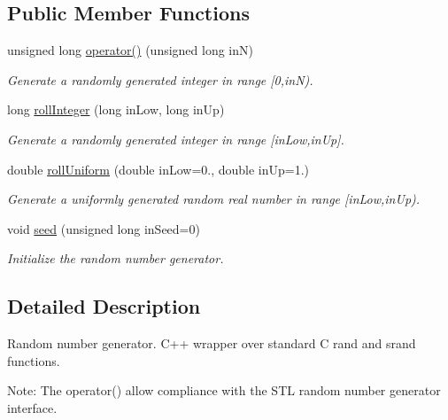\subsection*{Public Member Functions}
\begin{DoxyCompactItemize}
\item 
unsigned long \hyperlink{classPuppy_1_1Randomizer_a5eb79b633ba7cb009cce593a34dc8e27}{operator()} (unsigned long in\+N)
\begin{DoxyCompactList}\small\item\em Generate a randomly generated integer in range \mbox{[}0,in\+N). \end{DoxyCompactList}\item 
long \hyperlink{classPuppy_1_1Randomizer_ad1086e7ea63f1fd0cbf077001963a3bc}{roll\+Integer} (long in\+Low, long in\+Up)
\begin{DoxyCompactList}\small\item\em Generate a randomly generated integer in range \mbox{[}in\+Low,in\+Up\mbox{]}. \end{DoxyCompactList}\item 
double \hyperlink{classPuppy_1_1Randomizer_aa5dd7d1aa93080943275b0e56634f2ea}{roll\+Uniform} (double in\+Low=0., double in\+Up=1.)
\begin{DoxyCompactList}\small\item\em Generate a uniformly generated random real number in range \mbox{[}in\+Low,in\+Up). \end{DoxyCompactList}\item 
void \hyperlink{classPuppy_1_1Randomizer_a46771ed34b2950edb092327db06bbe7f}{seed} (unsigned long in\+Seed=0)
\begin{DoxyCompactList}\small\item\em Initialize the random number generator. \end{DoxyCompactList}\end{DoxyCompactItemize}


\subsection{Detailed Description}
Random number generator. C++ wrapper over standard C rand and srand functions. 

\begin{DoxyParagraph}{Note\+:}
The operator() allow compliance with the S\+T\+L random number generator interface. 
\end{DoxyParagraph}


